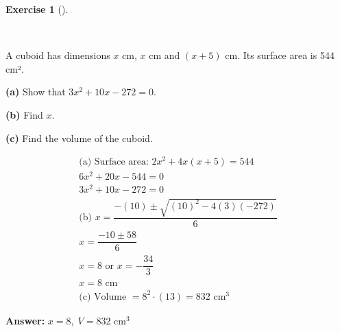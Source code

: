 \documentclass[
  letterpaper,
  DIV=11,
  numbers=noendperiod]{scrreprt}
\theoremstyle{definition}
\newtheorem{exercise}{Exercise}[chapter]
\theoremstyle{remark}
\begin{document}
\begin{exercise}[]\protect\hypertarget{exr-u6-31-1}{}\label{exr-u6-31-1}

~

A cuboid has dimensions \(x\) cm, \(x\) cm and \((x+5)\) cm. Its surface
area is 544 cm².

\textbf{(a)} Show that \(3x^2 + 10x - 272 = 0\).

\textbf{(b)} Find \(x\).

\textbf{(c)} Find the volume of the cuboid.

\begin{tcolorbox}[enhanced jigsaw, opacitybacktitle=0.6, coltitle=black, arc=.35mm, colframe=quarto-callout-tip-color-frame, colback=white, bottomrule=.15mm, left=2mm, colbacktitle=quarto-callout-tip-color!10!white, titlerule=0mm, opacityback=0, title=\textcolor{quarto-callout-tip-color}{\faLightbulb}\hspace{0.5em}{🔍 View Solution}, leftrule=.75mm, breakable, rightrule=.15mm, bottomtitle=1mm, toptitle=1mm, toprule=.15mm]

\begin{align*}
\text{(a) Surface area: } 2x^2 + 4x(x+5) = 544 \\ 6x^2 + 20x - 544 = 0 \\ 3x^2 + 10x - 272 = 0 \\ \text{(b) } x = \dfrac{-(10) \pm \sqrt{(10)^2 - 4(3)(-272)}}{6} \\ x = \dfrac{-10 \pm 58}{6} \\ x = 8 \text{ or } x = -\dfrac{34}{3} \\ x = 8 \text{ cm} \\ \text{(c) Volume } = 8^2 \cdot (13) = 832 \text{ cm}^3
\end{align*}

\textbf{Answer:} \(x = 8,\; V = 832 \text{ cm}^3\)

\end{tcolorbox}

\end{exercise}
\end{document}
